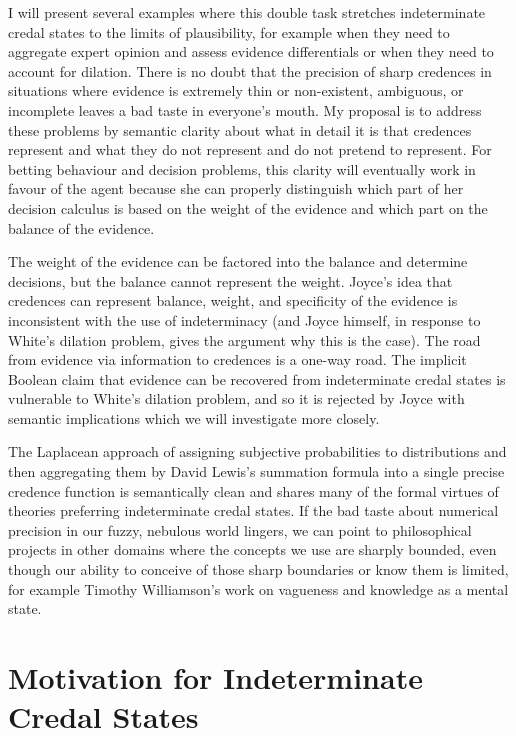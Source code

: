 I will present several examples where this double task stretches indeterminate credal states to the limits of plausibility, for example when they need to aggregate expert opinion and assess evidence differentials or when they need to account for dilation. There is no doubt that the precision of sharp credences in situations where evidence is extremely thin or non-existent, ambiguous, or incomplete leaves a bad taste in everyone's mouth. My proposal is to address these problems by semantic clarity about what in detail it is that credences represent and what they do not represent and do not pretend to represent. For betting behaviour and decision problems, this clarity will eventually work in favour of the agent because she can properly distinguish which part of her decision calculus is based on the weight of the evidence and which part on the balance of the evidence.

The weight of the evidence can be factored into the balance and determine decisions, but the balance cannot represent the weight. Joyce's idea that credences can represent balance, weight, and specificity of the evidence is inconsistent with the use of indeterminacy (and Joyce himself, in response to White's dilation problem, gives the argument why this is the case). The road from evidence via information to credences is a one-way road. The implicit Boolean claim that evidence can be recovered from indeterminate credal states is vulnerable to White's dilation problem, and so it is rejected by Joyce with semantic implications which we will investigate more closely.

The Laplacean approach of assigning subjective probabilities to distributions and then aggregating them by David Lewis's summation formula into a single precise credence function is semantically clean and shares many of the formal virtues of theories preferring indeterminate credal states. If the bad taste about numerical precision in our fuzzy, nebulous world lingers, we can point to philosophical projects in other domains where the concepts we use are sharply bounded, even though our ability to conceive of those sharp boundaries or know them is limited, for example Timothy Williamson's work on vagueness and knowledge as a mental state.

\section{Motivation for Indeterminate Credal States}
\label{MotivationForIndeterminateCredal States}

